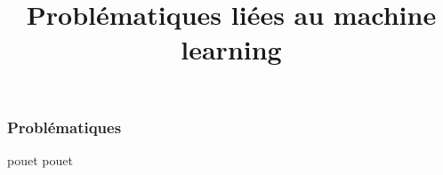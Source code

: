 \documentclass{formation}
\title{Problématiques liées au machine learning}
\subtitle{}
\begin{document}
\begin{frame}
  \frametitle{Problématiques}
  pouet pouet
\end{frame}
\end{document}

